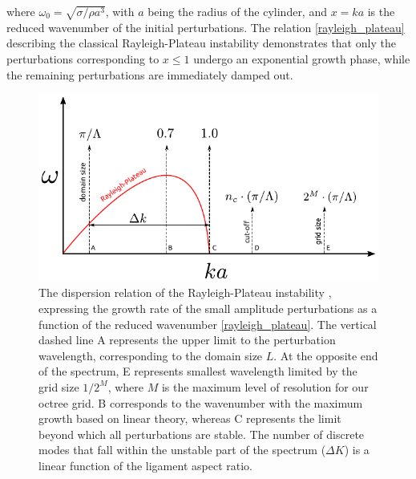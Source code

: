 
where $\omega_0 = \sqrt{\sigma/ \rho a^3}$, with $a$ being the radius 
of the cylinder, and $x= ka$ is the reduced wavenumber of the initial perturbations. 
The relation \eqref{rayleigh_plateau} describing the classical 
Rayleigh-Plateau instability \cite{rayleigh1879a, plateau1849} 
demonstrates that only the perturbations corresponding to $x \leq 1 $ 
undergo an exponential growth phase, while the remaining perturbations 
are immediately damped out. 

\begin{figure}
\centering
\includegraphics{plots/ligament_breakup/wave_quant.pdf}
\caption{ The dispersion relation of the Rayleigh-Plateau instability 
	\cite{rayleigh1879a, plateau1849}, expressing the growth rate of 
	the small amplitude perturbations as a function of 
	the reduced wavenumber \eqref{rayleigh_plateau}.
	The vertical dashed line A represents the upper limit
	to the perturbation wavelength, corresponding to the domain size $L$. 
	At the opposite end of the spectrum, E represents smallest wavelength  
        limited by the grid size $1/2^M$, where $M$ is the maximum level of 
	resolution for our octree grid. B corresponds to the wavenumber with 
	the maximum growth based on linear theory, whereas C represents the limit
	beyond which all perturbations are stable. The number of discrete modes
	that fall within the unstable part of the spectrum ($\Delta K$) 
	is a linear function of the ligament aspect ratio. 
	}
\label{quant}
\end{figure}


